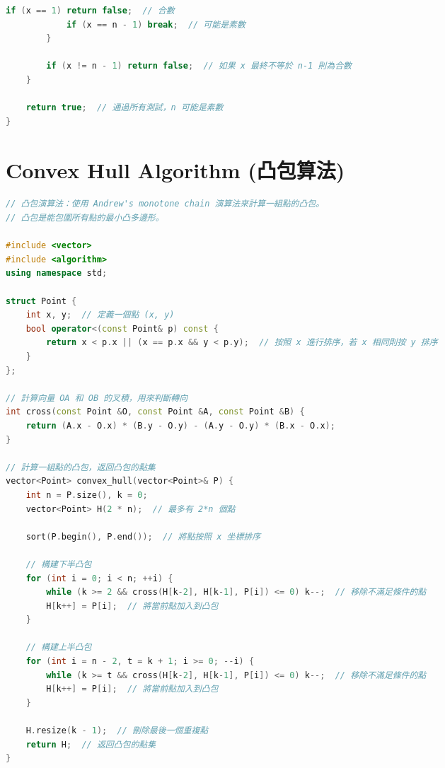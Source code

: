 \documentclass{article}
\begin{document}
\begin{multicols}{2}
\begin{lstlisting}[language=C++]
            if (x == 1) return false;  // 合數
            if (x == n - 1) break;  // 可能是素數
        }

        if (x != n - 1) return false;  // 如果 x 最終不等於 n-1 則為合數
    }

    return true;  // 通過所有測試，n 可能是素數
}
\end{lstlisting}

\section{Convex Hull Algorithm (凸包算法)}

\begin{lstlisting}[language=C++]
// 凸包演算法：使用 Andrew's monotone chain 演算法來計算一組點的凸包。
// 凸包是能包圍所有點的最小凸多邊形。

#include <vector>
#include <algorithm>
using namespace std;

struct Point {
    int x, y;  // 定義一個點 (x, y)
    bool operator<(const Point& p) const {
        return x < p.x || (x == p.x && y < p.y);  // 按照 x 進行排序，若 x 相同則按 y 排序
    }
};

// 計算向量 OA 和 OB 的叉積，用來判斷轉向
int cross(const Point &O, const Point &A, const Point &B) {
    return (A.x - O.x) * (B.y - O.y) - (A.y - O.y) * (B.x - O.x);
}

// 計算一組點的凸包，返回凸包的點集
vector<Point> convex_hull(vector<Point>& P) {
    int n = P.size(), k = 0;
    vector<Point> H(2 * n);  // 最多有 2*n 個點

    sort(P.begin(), P.end());  // 將點按照 x 坐標排序

    // 構建下半凸包
    for (int i = 0; i < n; ++i) {
        while (k >= 2 && cross(H[k-2], H[k-1], P[i]) <= 0) k--;  // 移除不滿足條件的點
        H[k++] = P[i];  // 將當前點加入到凸包
    }

    // 構建上半凸包
    for (int i = n - 2, t = k + 1; i >= 0; --i) {
        while (k >= t && cross(H[k-2], H[k-1], P[i]) <= 0) k--;  // 移除不滿足條件的點
        H[k++] = P[i];  // 將當前點加入到凸包
    }

    H.resize(k - 1);  // 刪除最後一個重複點
    return H;  // 返回凸包的點集
}
\end{lstlisting}


\end{multicols}
\end{document}
